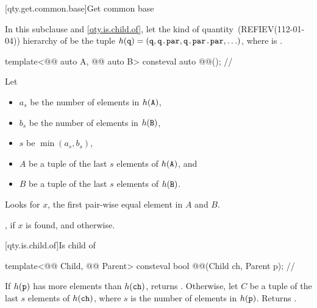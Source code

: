 [qty.get.common.base]{Get common base}

\pnum
In this subclause and \ref{qty.is.child.of},
let the kind of quantity~(REFIEV(112-01-04)) hierarchy of  be the tuple
$h(\texttt{\protect q}) = ( \texttt{\protect q}, \texttt{\protect q.par}, \texttt{\protect q.par.par}, \ldots )$,
where  is .

\begin{itemdecl}
template<@@ auto A, @@ auto B>
consteval auto @@();  // \expos
\end{itemdecl}

\begin{itemdescr}
\pnum
Let
\begin{itemize}
\item
$a_s$ be the number of elements in $h(\texttt{\protect A})$,
\item
$b_s$ be the number of elements in $h(\texttt{\protect B})$,
\item
$s$ be $\operatorname{min}(a_s, b_s)$,
\item
$A$ be a tuple of the last $s$ elements of $h(\texttt{\protect A})$, and
\item
$B$ be a tuple of the last $s$ elements of $h(\texttt{\protect B})$.
\end{itemize}

\pnum
\effects
Looks for $x$, the first pair-wise equal element in $A$ and $B$.

\pnum
\returns
{}, if $x$ is found, and  otherwise.
\end{itemdescr}

[qty.is.child.of]{Is child of}

\begin{itemdecl}
template<@@ Child, @@ Parent>
consteval bool @@(Child ch, Parent p);  // \expos
\end{itemdecl}

\begin{itemdescr}
\pnum
\returns
If $h(\texttt{\protect p})$ has more elements than $h(\texttt{\protect ch})$, returns .
Otherwise, let $C$ be a tuple of the last $s$ elements of $h(\texttt{\protect ch})$,
where $s$ is the number of elements in $h(\texttt{\protect p})$.
Returns .
\end{itemdescr}

